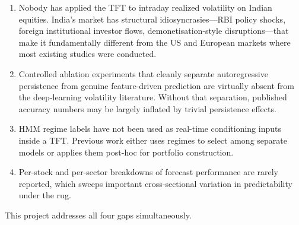 \begin{enumerate}
\item Nobody has applied the TFT to intraday realized volatility on Indian equities. India's market has structural idiosyncrasies---RBI policy shocks, foreign institutional investor flows, demonetisation-style disruptions---that make it fundamentally different from the US and European markets where most existing studies were conducted.
\item Controlled ablation experiments that cleanly separate autoregressive persistence from genuine feature-driven prediction are virtually absent from the deep-learning volatility literature. Without that separation, published accuracy numbers may be largely inflated by trivial persistence effects.
\item HMM regime labels have not been used as real-time conditioning inputs inside a TFT. Previous work either uses regimes to select among separate models or applies them post-hoc for portfolio construction.
\item Per-stock and per-sector breakdowns of forecast performance are rarely reported, which sweeps important cross-sectional variation in predictability under the rug.
\end{enumerate}

This project addresses all four gaps simultaneously.
